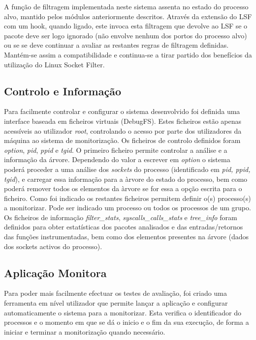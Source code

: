 A função de filtragem  implementada neste sistema assenta no estado do processo alvo, mantido pelos módulos anteriormente descritos.
Através da extensão do LSF com um hook, quando ligado, este invoca esta filtragem que devolve ao LSF se o pacote deve ser logo ignorado (não envolve nenhum dos portos do processo alvo) ou se se deve continuar a avaliar as restantes regras de filtragem definidas. Mantém-se assim a compatibilidade e continua-se a tirar partido dos benefícios da utilização do Linux Socket Filter.



\subsection*{Controlo e Informação}
\label{sub:data_information}

Para facilmente controlar e configurar o sistema desenvolvido foi definida uma interface baseada em ficheiros virtuais (DebugFS). Estes ficheiros estão apenas acessíveis ao utilizador \textit{root}, controlando o acesso por parte dos utilizadores da máquina ao sistema de monitorização. Os ficheiros de controlo definidos foram \textit{option}, \textit{pid}, \textit{ppid} e \textit{tgid}. O primeiro ficheiro permite controlar a análise e a informação da árvore. Dependendo do valor a escrever em \textit{option} o sistema poderá proceder a uma análise dos \textit{sockets} do processo (identificado em \textit{pid, ppid, tgid}), e carregar essa informação para a àrvore do estado do processo, bem como poderá remover todos os elementos da àrvore se for essa a opção escrita para o ficheiro. Como foi indicado os restantes ficheiros permitem definir o(s) processo(s) a monitorizar. Pode ser indicado um processo ou todos os processos de um grupo. Os ficheiros de informação \textit{filter\_stats},  \textit{syscalls\_calls\_stats} e \textit{tree\_info} foram definidos para obter estatísticas dos pacotes analisados e das entradas/retornos das funções instrumentadas, bem como dos elementos presentes na árvore (dados dos sockets activos do processo).


\subsection{Aplicação Monitora}
\label{sub:monitor_app}

Para poder mais facilmente efectuar os testes de avaliação, foi criado uma ferramenta em nível utilizador que permite lançar a aplicação e configurar automaticamente o sistema para a monitorizar. Esta verifica o identificador do processos e o momento em que se dá o inicio e o fim da sua execução, de forma a iniciar e terminar a monitorização quando necessário.

